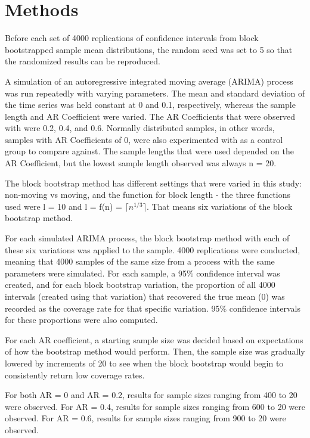 \documentclass[12pt, letterpaper, titlepage]{article}
\begin{document}
\section{Methods}
\label{sec:methods}

Before each set of 4000 replications of confidence intervals from block bootstrapped sample mean distributions, the random seed was set to 5 so that the randomized results can be 
reproduced. 

A simulation of an autoregressive integrated moving average (ARIMA) process was run 
repeatedly with varying parameters. 
The mean and standard deviation of the time series was held constant at 0 and 0.1, respectively, whereas 
the sample length and AR Coefficient
 were varied. The AR Coefficients that were observed with were 0.2, 0.4, and 0.6. Normally distributed samples, in other words, samples with AR Coefficients of 0, were also experimented with as a control group to compare against. The sample lengths 
 that were used depended on the AR
 Coefficient, but the lowest sample length observed was always n = 20.
 
 The block bootstrap method has different settings that were varied in this study: 
 non-moving vs moving, and the function for block length - the three functions used were l = 10 and l = f(n) = $\lceil n^{1/3} \rceil$. That means six variations of the block bootstrap method. 

For each simulated ARIMA process, the block bootstrap method with each of these six variations was applied to the sample. 4000 replications were conducted, meaning that 4000 samples of the same size from a process with the same parameters were simulated. For each sample, a 95\% confidence interval was created, and for each block bootstrap variation, the proportion of all 4000 intervals (created using that variation) that recovered the true mean (0) was recorded as the coverage
 rate for that specific variation. 95\% confidence intervals for these proportions were also computed.
 
For each AR coefficient, a starting sample size was decided based on expectations of how the bootstrap method would perform. Then, the sample size was gradually lowered by increments of 20 to see when
the block bootstrap would begin to consistently return low coverage rates. 

For both AR = 0 and AR = 0.2, results for sample sizes ranging from 400 to 20 were observed. For AR = 0.4, results for sample sizes ranging from 600 to 20 were observed. For AR = 0.6, results for sample sizes ranging from 900 to 20 were observed.
\end{document}
